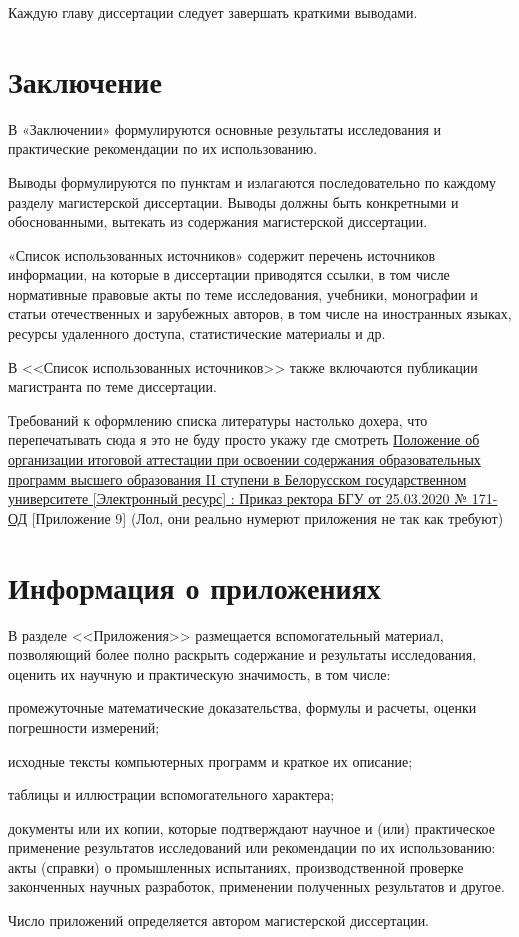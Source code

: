 \documentclass{mpaper}
\begin{document}
    Каждую главу диссертации следует завершать краткими выводами.
    \chapter*{Заключение}
    В «Заключении» формулируются основные результаты исследования и практические рекомендации по их использованию.

    Выводы формулируются по пунктам и излагаются последовательно по каждому разделу магистерской диссертации. Выводы должны быть конкретными и обоснованными, вытекать из содержания магистерской диссертации.

    «Список использованных источников» содержит перечень источников информации, на которые в диссертации приводятся ссылки, в том числе нормативные правовые акты по теме исследования, учебники, монографии и статьи отечественных и зарубежных авторов, в том числе на иностранных языках, ресурсы удаленного доступа, статистические материалы и др.

    В <<Список использованных источников>> также включаются публикации магистранта по теме диссертации.
    \begin{thebibliography}{9}
         Требований к оформлению списка литературы настолько дохера, что перепечатывать сюда я это не буду просто укажу где смотреть
         \href{https://rci.bsu.by/images/docs/prikaz_polozhenie_ob_attestatsi_magistratura_2020.pdf}{Положение об организации итоговой аттестации при освоении содержания образовательных программ высшего образования II ступени в Белорусском государственном университете [Электронный ресурс] : Приказ ректора БГУ от 25.03.2020 № 171-ОД} [Приложение 9] (Лол, они реально нумерют приложения не так как требуют)
    \end{thebibliography}
    \appendix
    \chapter{Информация о приложениях}
    В разделе <<Приложения>> размещается вспомогательный материал, позволяющий более полно раскрыть содержание и результаты исследования, оценить их научную и практическую значимость, в том числе:

    промежуточные математические доказательства, формулы и расчеты, оценки погрешности измерений;

    исходные тексты компьютерных программ и краткое их описание;

    таблицы и иллюстрации вспомогательного характера;

    документы или их копии, которые подтверждают научное и (или) практическое применение результатов исследований или рекомендации по их использованию: акты (справки) о промышленных испытаниях, производственной проверке законченных научных разработок, применении полученных результатов и другое.

    Число приложений определяется автором магистерской диссертации.
\end{document}
